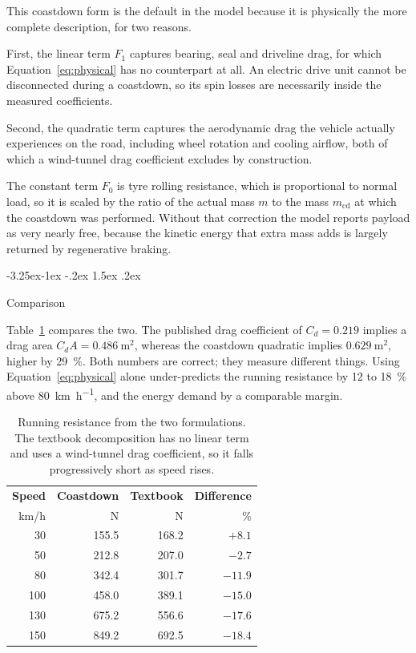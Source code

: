 \documentclass[twocolumn]{article}
\makeatletter
\renewcommand\subsubsection{\@startsection{subsubsection}{3}{\z@}%
  {-3.25ex\@plus -1ex \@minus -.2ex}%
  {1.5ex \@plus .2ex}%
  {\raggedright\normalfont\normalsize\bfseries}}
\makeatother
\begin{document}
This coastdown form is the default in the model because it is physically the
more complete description, for two reasons.

First, the linear term $F_1$ captures bearing, seal and driveline drag, for
which Equation~\ref{eq:physical} has no counterpart at all. An electric drive
unit cannot be disconnected during a coastdown, so its spin losses are
necessarily inside the measured coefficients.

Second, the quadratic term captures the aerodynamic drag the vehicle actually
experiences on the road, including wheel rotation and cooling airflow, both of
which a wind-tunnel drag coefficient excludes by construction.

The constant term $F_0$ is tyre rolling resistance, which is proportional to
normal load, so it is scaled by the ratio of the actual mass $m$ to the mass
$m_{\mathrm{cd}}$ at which the coastdown was performed. Without that correction
the model reports payload as very nearly free, because the kinetic energy that
extra mass adds is largely returned by regenerative braking.

\subsubsection{Comparison}

Table~\ref{tab:roadload} compares the two. The published drag coefficient of
$C_d = 0.219$ implies a drag area $C_d A = \SI{0.486}{\metre\squared}$, whereas
the coastdown quadratic implies $\SI{0.629}{\metre\squared}$, higher by
\SI{29}{\percent}. Both numbers are correct; they measure different things.
Using Equation~\ref{eq:physical} alone under-predicts the running resistance by
12 to \SI{18}{\percent} above \SI{80}{\kilo\metre\per\hour}, and the energy
demand by a comparable margin.

\begin{table}[H]
\centering
\caption{Running resistance from the two formulations. The textbook
decomposition has no linear term and uses a wind-tunnel drag coefficient, so it
falls progressively short as speed rises.}
\label{tab:roadload}
\footnotesize
\begin{tabular}{@{}rrrr@{}}
\toprule
\textbf{Speed} & \textbf{Coastdown} & \textbf{Textbook} & \textbf{Difference} \\
km/h & N & N & \% \\
\midrule
 30 & 155.5 & 168.2 & $+8.1$ \\
 50 & 212.8 & 207.0 & $-2.7$ \\
 80 & 342.4 & 301.7 & $-11.9$ \\
100 & 458.0 & 389.1 & $-15.0$ \\
130 & 675.2 & 556.6 & $-17.6$ \\
150 & 849.2 & 692.5 & $-18.4$ \\
\bottomrule
\end{tabular}
\end{table}
\end{document}

